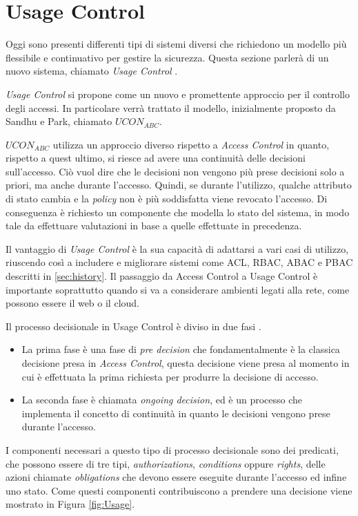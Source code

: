 \section{Usage Control} %
\label{sec:usage_control}
Oggi sono presenti differenti tipi di sistemi diversi che richiedono un modello più flessibile e continuativo per gestire la sicurezza. Questa sezione parlerà di un nuovo sistema, chiamato \textit{Usage Control} \cite{SurveyUsageControl}. \par
\textit{Usage Control} si propone come un nuovo e promettente approccio per il controllo degli accessi. In particolare verrà trattato il modello, inizialmente proposto da Sandhu e Park\cite{SurveyUsageControl}, chiamato $UCON_{ABC}$. \par
$UCON_{ABC}$ utilizza un approccio diverso rispetto a \textit{Access Control} in quanto, rispetto a quest ultimo, si riesce ad avere una continuità delle decisioni sull'accesso. Ciò vuol dire che le decisioni non vengono più prese decisioni solo a priori, ma anche durante l'accesso.  Quindi, se durante l'utilizzo, qualche attributo di stato cambia e la \textit{policy} non è più soddisfatta viene revocato l'accesso. Di conseguenza è richiesto un componente che modella lo stato del sistema, in modo tale da effettuare valutazioni in base a quelle effettuate in precedenza. \par
Il vantaggio di \textit{Usage Control} è la sua capacità di adattarsi a vari casi di utilizzo, riuscendo così a includere e migliorare sistemi come \ac{ACL}, \ac{RBAC}, \ac{ABAC} e \ac{PBAC} descritti in \ref{sec:history}.
Il passaggio da Access Control a Usage Control è importante soprattutto quando si va a considerare ambienti legati alla rete, come possono essere il web o il cloud. \par
Il processo decisionale in Usage Control è diviso in due fasi \cite{UsageControlCloud}. 
\begin{itemize}
\item La prima fase è una fase di \textit{pre decision} che fondamentalmente è la classica decisione presa in \textit{Access Control}, questa decisione viene presa al momento in cui è effettuata la prima richiesta per produrre la decisione di accesso.
\item La seconda fase è chiamata \textit{ongoing decision}, ed è un processo che implementa il concetto di continuità in quanto le decisioni vengono prese durante l'accesso.\par
\end{itemize}
I componenti necessari a questo tipo di processo decisionale sono dei predicati, che possono essere di tre tipi, \textit{authorizations}, \textit{conditions} oppure \textit{rights}, delle azioni chiamate \textit{obligations} che devono essere eseguite durante l'accesso ed infine uno stato. 
 Come questi componenti contribuiscono a prendere una decisione viene mostrato in Figura \ref{fig:Usage}.


